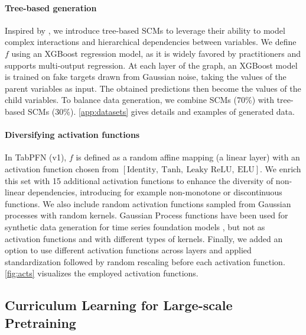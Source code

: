\documentclass{article}
\theoremstyle{plain}
\theoremstyle{definition}
\theoremstyle{remark}
\begin{document}
\paragraph{Tree-based generation} Inspired by \citet{grinsztajn2024reconcilier}, we introduce tree-based SCMs to leverage their ability to model complex interactions and hierarchical dependencies between variables. We define \(f\) using an XGBoost regression model, as it is widely favored by practitioners and supports multi-output regression. At each layer of the graph, an XGBoost model is trained on fake targets drawn from Gaussian noise, taking the values of the parent variables as input. The obtained predictions then become the values of the child variables. To balance data generation, we combine SCMs (70\%) with tree-based SCMs (30\%). \cref{app:datasets} gives details and examples of generated data.

\paragraph{Diversifying activation functions}
In TabPFN (v1), \(f\) is defined as a random affine mapping (a linear layer) with an activation function chosen from \([ \text{Identity}, \ \text{Tanh}, \ \text{Leaky ReLU}, \ \text{ELU} ]\). We enrich this set with 15 additional activation functions to enhance the diversity of non-linear dependencies, introducing for example non-monotone or discontinuous functions. We also include random activation functions sampled from Gaussian processes with random kernels. Gaussian Process functions have been used for synthetic data generation for time series foundation models \citep{ansari2024chronos}, but not as activation functions and with different types of kernels. Finally, we added an option to use different activation functions across layers and applied standardization followed by random rescaling before each activation function. \cref{fig:acts} visualizes the employed activation functions.

\subsection{Curriculum Learning for Large-scale Pretraining}
\end{document}
